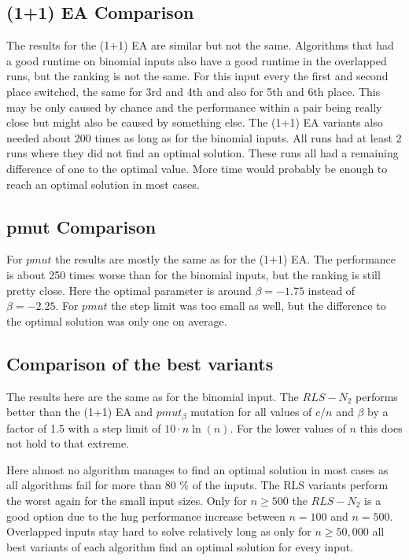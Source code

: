 \subsection{(1+1) EA Comparison}




The results for the (1+1) EA are similar but not the same.
Algorithms that had a good runtime on binomial inputs also have a good runtime in the overlapped runs, but the ranking is not the same.
For this input every the first and second place switched, the same for 3rd and 4th and also for 5th and 6th place.
This may be only caused by chance and the performance within a pair being really close but might also be caused by something else.
The (1+1) EA variants also needed about 200 times as long as for the binomial inputs.
All runs had at least 2 runs where they did not find an optimal solution.
These runs all had a remaining difference of one to the optimal value.
More time would probably be enough to reach an optimal solution in most cases.
\subsection{pmut Comparison}




For $pmut$ the results are mostly the same as for the (1+1) EA.
The performance is about 250 times worse than for the binomial inputs, but the ranking is still pretty close.
Here the optimal parameter is around $\beta=-1.75$ instead of $\beta=-2.25$.
For $pmut$ the step limit was too small as well, but the difference to the optimal solution was only one on average.
\subsection{Comparison of the best variants}




The results here are the same as for the binomial input. The $RLS-N_2$ performs better than the (1+1) EA and $pmut_\beta$ mutation for all values of $c/n$ and $\beta$ by a factor of 1.5 with a step limit of $10 \cdot n \ln(n)$. For the lower values of $n$ this does not hold to that extreme.



Here almost no algorithm manages to find an optimal solution in most cases as all algorithms fail for more than 80 \% of the inputs.
The RLS variants perform the worst again for the small input sizes.
Only for $n\ge500$ the $RLS-N_{2}$ is a good option due to the hug performance increase between $n=100$ and $n=500$.
Overlapped inputs stay hard to solve relatively long as only for $n\ge50,000$ all best variants of each algorithm find an optimal solution for every input.


